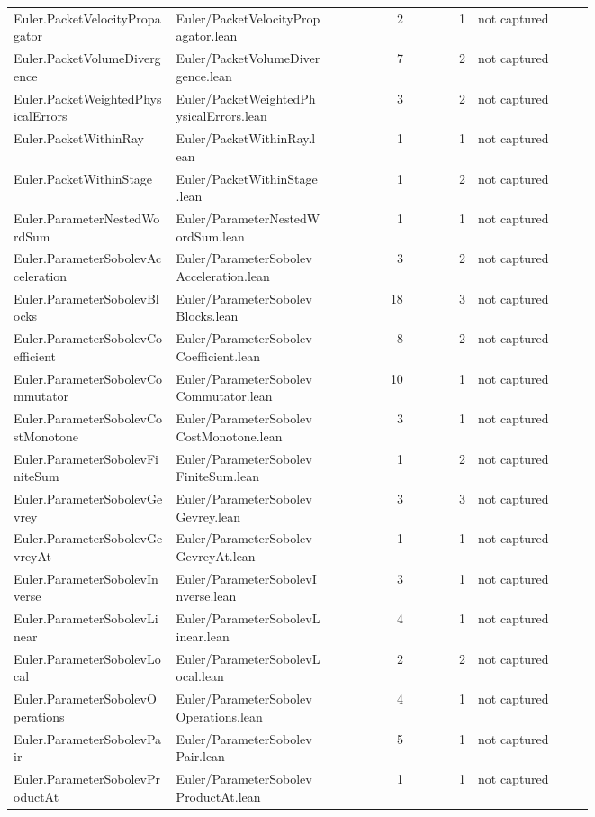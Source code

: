 \documentclass[10pt]{article}
\begin{document}
\begin{longtable}{p{0.28\linewidth}p{0.27\linewidth}r r p{0.20\linewidth}}
Euler.PacketVelocityPropagator & Euler/PacketVelocityPropagator.lean & 2 & 1 & not captured\\
Euler.PacketVolumeDivergence & Euler/PacketVolumeDivergence.lean & 7 & 2 & not captured\\
Euler.PacketWeightedPhysicalErrors & Euler/PacketWeightedPhysicalErrors.lean & 3 & 2 & not captured\\
Euler.PacketWithinRay & Euler/PacketWithinRay.lean & 1 & 1 & not captured\\
Euler.PacketWithinStage & Euler/PacketWithinStage.lean & 1 & 2 & not captured\\
Euler.ParameterNestedWordSum & Euler/ParameterNestedWordSum.lean & 1 & 1 & not captured\\
Euler.ParameterSobolevAcceleration & Euler/ParameterSobolevAcceleration.lean & 3 & 2 & not captured\\
Euler.ParameterSobolevBlocks & Euler/ParameterSobolevBlocks.lean & 18 & 3 & not captured\\
Euler.ParameterSobolevCoefficient & Euler/ParameterSobolevCoefficient.lean & 8 & 2 & not captured\\
Euler.ParameterSobolevCommutator & Euler/ParameterSobolevCommutator.lean & 10 & 1 & not captured\\
Euler.ParameterSobolevCostMonotone & Euler/ParameterSobolevCostMonotone.lean & 3 & 1 & not captured\\
Euler.ParameterSobolevFiniteSum & Euler/ParameterSobolevFiniteSum.lean & 1 & 2 & not captured\\
Euler.ParameterSobolevGevrey & Euler/ParameterSobolevGevrey.lean & 3 & 3 & not captured\\
Euler.ParameterSobolevGevreyAt & Euler/ParameterSobolevGevreyAt.lean & 1 & 1 & not captured\\
Euler.ParameterSobolevInverse & Euler/ParameterSobolevInverse.lean & 3 & 1 & not captured\\
Euler.ParameterSobolevLinear & Euler/ParameterSobolevLinear.lean & 4 & 1 & not captured\\
Euler.ParameterSobolevLocal & Euler/ParameterSobolevLocal.lean & 2 & 2 & not captured\\
Euler.ParameterSobolevOperations & Euler/ParameterSobolevOperations.lean & 4 & 1 & not captured\\
Euler.ParameterSobolevPair & Euler/ParameterSobolevPair.lean & 5 & 1 & not captured\\
Euler.ParameterSobolevProductAt & Euler/ParameterSobolevProductAt.lean & 1 & 1 & not captured\\

\end{longtable}
\end{document}
